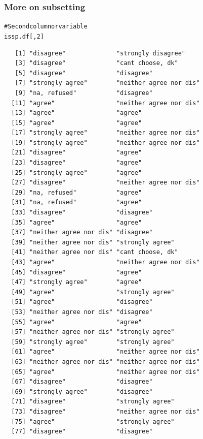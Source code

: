 \documentclass{beamer}\usepackage[]{graphicx}\usepackage[]{color}
\makeatletter
\newcommand{\hlnum}[1]{\textcolor[rgb]{0.533,0,0.133}{#1}}%
\newcommand{\hlcom}[1]{\textcolor[rgb]{1,0.533,0}{#1}}%
\newcommand{\hlstd}[1]{\textcolor[rgb]{0,0,0}{#1}}%
\newenvironment{kframe}{%
 \def\at@end@of@kframe{}%
 \ifinner\ifhmode%
  \def\at@end@of@kframe{\end{minipage}}%
  \begin{minipage}{\columnwidth}%
 \fi\fi%
 \def\FrameCommand##1{\hskip\@totalleftmargin \hskip-\fboxsep
 \colorbox{shadecolor}{##1}\hskip-\fboxsep
     \hskip-\linewidth \hskip-\@totalleftmargin \hskip\columnwidth}%
 \MakeFramed {\advance\hsize-\width
   \@totalleftmargin\z@ \linewidth\hsize
   \@setminipage}}%
 {\par\unskip\endMakeFramed%
 \at@end@of@kframe}
\newenvironment{knitrout}{}{} %
\makeatother
\begin{document}
\begin{frame}[fragile]
\frametitle{More on subsetting}
\begin{knitrout}
\color{fgcolor}\begin{kframe}
\begin{alltt}
\hlcom{#Second column or variable}
\hlstd{issp.df[,} \hlnum{2}\hlstd{]}
\end{alltt}
\begin{verbatim}
   [1] "disagree"              "strongly disagree"    
   [3] "disagree"              "cant choose, dk"      
   [5] "disagree"              "disagree"             
   [7] "strongly agree"        "neither agree nor dis"
   [9] "na, refused"           "disagree"             
  [11] "agree"                 "neither agree nor dis"
  [13] "agree"                 "agree"                
  [15] "agree"                 "agree"                
  [17] "strongly agree"        "neither agree nor dis"
  [19] "strongly agree"        "neither agree nor dis"
  [21] "disagree"              "agree"                
  [23] "disagree"              "agree"                
  [25] "strongly agree"        "agree"                
  [27] "disagree"              "neither agree nor dis"
  [29] "na, refused"           "agree"                
  [31] "na, refused"           "agree"                
  [33] "disagree"              "disagree"             
  [35] "agree"                 "agree"                
  [37] "neither agree nor dis" "disagree"             
  [39] "neither agree nor dis" "strongly agree"       
  [41] "neither agree nor dis" "cant choose, dk"      
  [43] "agree"                 "neither agree nor dis"
  [45] "disagree"              "agree"                
  [47] "strongly agree"        "agree"                
  [49] "agree"                 "strongly agree"       
  [51] "agree"                 "disagree"             
  [53] "neither agree nor dis" "disagree"             
  [55] "agree"                 "agree"                
  [57] "neither agree nor dis" "strongly agree"       
  [59] "strongly agree"        "strongly agree"       
  [61] "agree"                 "neither agree nor dis"
  [63] "neither agree nor dis" "neither agree nor dis"
  [65] "agree"                 "neither agree nor dis"
  [67] "disagree"              "disagree"             
  [69] "strongly agree"        "disagree"             
  [71] "disagree"              "strongly agree"       
  [73] "disagree"              "neither agree nor dis"
  [75] "agree"                 "strongly agree"       
  [77] "disagree"              "disagree"             

\end{verbatim}
\end{kframe}
\end{knitrout}
\end{frame}
\end{document}
